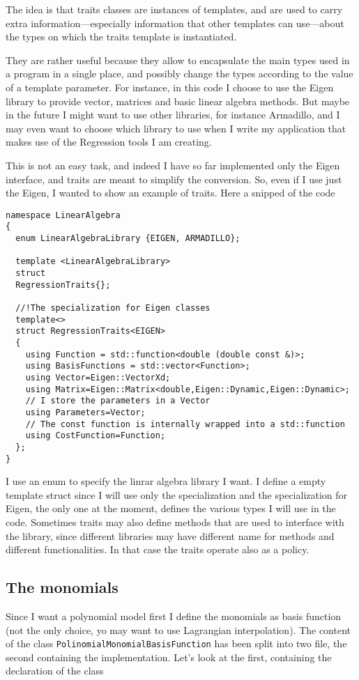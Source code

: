 \documentclass{article}
\newcommand{\li}{\lstinline}
\begin{document}
The idea is that traits classes are instances of templates, and are used to carry extra information—especially information that other templates can use—about the types on which the traits template is instantiated.

They are rather useful because they allow to encapsulate the main
types used in a program in a single place, and possibly change the
types according to the value of a template parameter. For instance, in
this code I choose to use the Eigen library to provide vector,
matrices and basic linear algebra methods. But maybe in the future I
might want to use other libraries, for instance Armadillo, and I may
even want to choose which library to use when I write my application
that makes use of the Regression tools I am creating.

This is not an easy task, and indeed I have so far implemented only the Eigen interface, and traits are meant to simplify the conversion. So, even if I use just the Eigen, I wanted to show an example of traits. Here a snipped of the code
\begin{lstlisting}[title={RegressionTraits.hpp}]
namespace LinearAlgebra
{
  enum LinearAlgebraLibrary {EIGEN, ARMADILLO};

  template <LinearAlgebraLibrary>
  struct
  RegressionTraits{};

  //!The specialization for Eigen classes
  template<>
  struct RegressionTraits<EIGEN>
  {
    using Function = std::function<double (double const &)>;
    using BasisFunctions = std::vector<Function>; 
    using Vector=Eigen::VectorXd;
    using Matrix=Eigen::Matrix<double,Eigen::Dynamic,Eigen::Dynamic>;
    // I store the parameters in a Vector
    using Parameters=Vector;
    // The const function is internally wrapped into a std::function
    using CostFunction=Function;
  };
}
\end{lstlisting}
I use an enum to specify the linrar algebra library I want. I define a empty template struct since I will use only the specialization and the
specialization for Eigen, the only one at the moment,
defines the various types I will use in the code.  Sometimes traits
may also define methods that are used to interface with the library,
since different libraries may have different name for methods and different
functionalities. In that case the traits operate also as a policy.
\subsection{The monomials}
Since I want a polynomial model first I define the monomials as basis function (not the only choice, yo may want to use Lagrangian interpolation).
The content of the class \li!PolinomialMonomialBasisFunction! has been split into two file, the second containing the implementation. Let's look at the first, containing the declaration of the class
\end{document}
